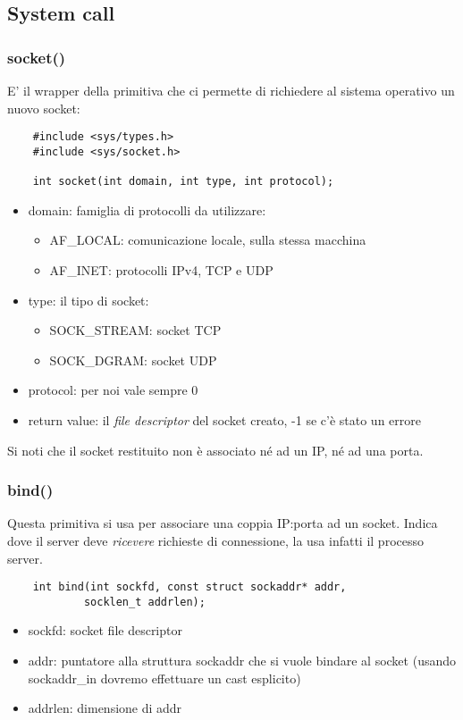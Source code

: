\subsection{System call}
\subsubsection{socket()}
E' il wrapper della primitiva che ci permette di richiedere al sistema operativo un nuovo socket:
\begin{verbatim}
    #include <sys/types.h>
    #include <sys/socket.h>
    
    int socket(int domain, int type, int protocol);
\end{verbatim}
\begin{itemize}
    \item domain: famiglia di protocolli da utilizzare:
    \begin{itemize}
        \item AF\_LOCAL: comunicazione locale, sulla stessa macchina
        \item AF\_INET: protocolli IPv4, TCP e UDP
    \end{itemize}

    \item type: il tipo di socket:
    \begin{itemize}
        \item SOCK\_STREAM: socket TCP
        \item SOCK\_DGRAM: socket UDP
    \end{itemize}

    \item protocol: per noi vale sempre 0

    \item return value: il \emph{file descriptor} del socket creato, -1 se c'è stato un errore
\end{itemize}
Si noti che il socket restituito non è associato né ad un IP, né ad una porta.

\subsubsection{bind()}
Questa primitiva si usa per associare una coppia IP:porta ad un socket.
Indica dove il server deve \emph{ricevere} richieste di connessione, la usa infatti il processo server.
\begin{verbatim}
    int bind(int sockfd, const struct sockaddr* addr,
            socklen_t addrlen);
\end{verbatim}
\begin{itemize}
    \item sockfd: socket file descriptor
    \item addr: puntatore alla struttura sockaddr che si vuole bindare al socket (usando sockaddr\_in dovremo effettuare un cast esplicito)
    \item addrlen: dimensione di addr
\end{itemize}

